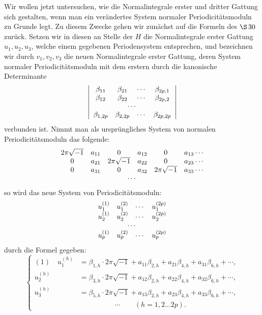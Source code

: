 \documentclass[10pt]{article}
\begin{document}
Wir wollen jetzt untersuchen, wie die Normalintegrale erster und dritter Gattung sich gestalten, wenn man ein verändertes System normaler Periodicitätsmoduln zu Grunde legt. Zu diesem Zwecke gehen wir zunächst auf die Formeln des \(\S\,30\) zurück. Setzen wir in diesen an Stelle der \(H\) die Normalintegrale erster Gattung \(u_1,u_2,u_3\), welche einem gegebenen Periodensystem entsprechen, und bezeichnen wir durch \(v_1,v_2,v_3\) die neuen Normalintegrale erster Gattung, deren System normaler Periodicitätsmoduln mit dem erstern durch die kanonische Determinante
\[
\left|\begin{array}{cccc}
\beta_{11}&\beta_{21}&\cdots&\beta_{2p,1}\\
\beta_{12}&\beta_{22}&\cdots&\beta_{2p,2}\\
\multicolumn{4}{c}{\cdots}\\
\beta_{1,2p}&\beta_{2,2p}&\cdots&\beta_{2p,2p}
\end{array}\right|
\]
verbunden ist. Nimmt man als ursprüngliches System von normalen Periodicitätsmoduln das folgende:
\[
\begin{array}{cccccc}
2\pi\sqrt{-1}&a_{11}&0&a_{12}&0&a_{13}\cdots\\
0&a_{21}&2\pi\sqrt{-1}&a_{22}&0&a_{23}\cdots\\
0&a_{31}&0&a_{32}&2\pi\sqrt{-1}&a_{33}\cdots\\
\multicolumn{6}{c}{\cdots}
\end{array}
\]
so wird das neue System von Periodicitätsmoduln:
\[
\begin{array}{cccc}
u_1^{(1)}&u_1^{(2)}&\cdots&u_1^{(2p)}\\
u_2^{(1)}&u_2^{(2)}&\cdots&u_2^{(2p)}\\
\multicolumn{4}{c}{\cdots}\\
u_p^{(1)}&u_p^{(2)}&\cdots&u_p^{(2p)}
\end{array}
\]
durch die Formel gegeben:
\[
\left\{
\begin{aligned}
(1)\quad u_1^{(h)}&=\beta_{1,h}\cdot2\pi\sqrt{-1}+a_{11}\beta_{2,h}+a_{21}\beta_{4,h}+a_{31}\beta_{6,h}+\cdots,\\
u_2^{(h)}&=\beta_{3,h}\cdot2\pi\sqrt{-1}+a_{12}\beta_{2,h}+a_{22}\beta_{4,h}+a_{32}\beta_{6,h}+\cdots,\\
u_3^{(h)}&=\beta_{5,h}\cdot2\pi\sqrt{-1}+a_{13}\beta_{2,h}+a_{23}\beta_{4,h}+a_{33}\beta_{6,h}+\cdots,\\
&\hspace{5em}\cdots\qquad (h=1,2\ldots2p).
\end{aligned}
\right.
\]
\end{document}

